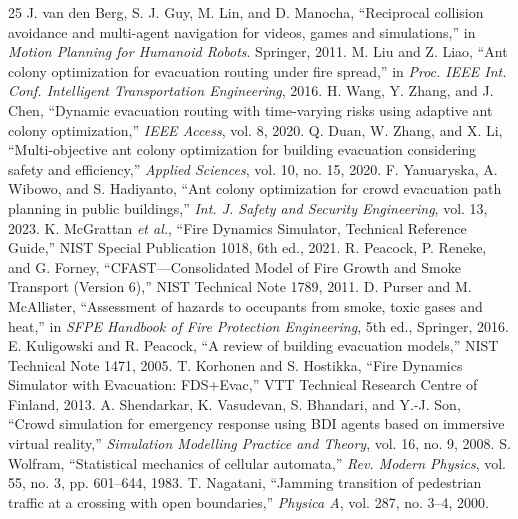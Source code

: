 \documentclass[conference]{IEEEtran}
\begin{document}
\begin{thebibliography}{25}
 J. van den Berg, S. J. Guy, M. Lin, and D. Manocha, ``Reciprocal collision avoidance and multi-agent navigation for videos, games and simulations,'' in \emph{Motion Planning for Humanoid Robots}. Springer, 2011.
 M. Liu and Z. Liao, ``Ant colony optimization for evacuation routing under fire spread,'' in \emph{Proc. IEEE Int. Conf. Intelligent Transportation Engineering}, 2016.
 H. Wang, Y. Zhang, and J. Chen, ``Dynamic evacuation routing with time-varying risks using adaptive ant colony optimization,'' \emph{IEEE Access}, vol. 8, 2020.
 Q. Duan, W. Zhang, and X. Li, ``Multi-objective ant colony optimization for building evacuation considering safety and efficiency,'' \emph{Applied Sciences}, vol. 10, no. 15, 2020.
 F. Yanuaryska, A. Wibowo, and S. Hadiyanto, ``Ant colony optimization for crowd evacuation path planning in public buildings,'' \emph{Int. J. Safety and Security Engineering}, vol. 13, 2023.
 K. McGrattan \emph{et al.}, ``Fire Dynamics Simulator, Technical Reference Guide,'' NIST Special Publication 1018, 6th ed., 2021.
 R. Peacock, P. Reneke, and G. Forney, ``CFAST---Consolidated Model of Fire Growth and Smoke Transport (Version 6),'' NIST Technical Note 1789, 2011.
 D. Purser and M. McAllister, ``Assessment of hazards to occupants from smoke, toxic gases and heat,'' in \emph{SFPE Handbook of Fire Protection Engineering}, 5th ed., Springer, 2016.
 E. Kuligowski and R. Peacock, ``A review of building evacuation models,'' NIST Technical Note 1471, 2005.
 T. Korhonen and S. Hostikka, ``Fire Dynamics Simulator with Evacuation: FDS+Evac,'' VTT Technical Research Centre of Finland, 2013.
 A. Shendarkar, K. Vasudevan, S. Bhandari, and Y.-J. Son, ``Crowd simulation for emergency response using BDI agents based on immersive virtual reality,'' \emph{Simulation Modelling Practice and Theory}, vol. 16, no. 9, 2008.
 S. Wolfram, ``Statistical mechanics of cellular automata,'' \emph{Rev. Modern Physics}, vol. 55, no. 3, pp. 601--644, 1983.
 T. Nagatani, ``Jamming transition of pedestrian traffic at a crossing with open boundaries,'' \emph{Physica A}, vol. 287, no. 3--4, 2000.

\end{thebibliography}
\end{document}
